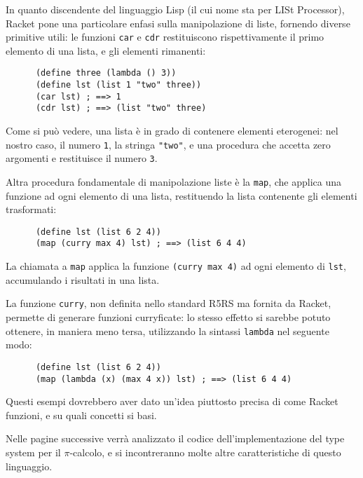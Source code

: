In quanto discendente del linguaggio Lisp (il cui nome sta per LISt
Processor), Racket pone una particolare enfasi sulla manipolazione di
liste, fornendo diverse primitive utili: le funzioni \lstinline{car} e
\lstinline{cdr} restituiscono rispettivamente il primo elemento di una
lista, e gli elementi rimanenti:

\begin{lstlisting}
      (define three (lambda () 3))
      (define lst (list 1 "two" three))
      (car lst) ; ==> 1
      (cdr lst) ; ==> (list "two" three)
\end{lstlisting}

Come si pu\`o vedere, una lista \`e in grado di contenere elementi
eterogenei: nel nostro caso, il numero \lstinline{1}, la stringa
\lstinline{"two"}, e una procedura che accetta zero argomenti e restituisce
il numero \lstinline{3}.

Altra procedura fondamentale di manipolazione liste \`e la \lstinline{map},
che applica una funzione ad ogni elemento di una lista, restituendo la
lista contenente gli elementi trasformati:

\begin{lstlisting}
      (define lst (list 6 2 4))
      (map (curry max 4) lst) ; ==> (list 6 4 4)
\end{lstlisting}

La chiamata a \lstinline{map} applica la funzione \lstinline{(curry max 4)}
ad ogni elemento di \lstinline{lst}, accumulando i risultati in una lista.

La funzione \lstinline{curry}, non definita nello standard R5RS ma fornita
da Racket, permette di generare funzioni curryficate: lo stesso effetto si
sarebbe potuto ottenere, in maniera meno tersa, utilizzando la sintassi
\lstinline{lambda} nel seguente modo:

\begin{lstlisting}
      (define lst (list 6 2 4))
      (map (lambda (x) (max 4 x)) lst) ; ==> (list 6 4 4)
\end{lstlisting}

Questi esempi dovrebbero aver dato un'idea piuttosto precisa di come Racket
funzioni, e su quali concetti si basi.

Nelle pagine successive verr\`a analizzato il codice dell'implementazione
del type system per il $\pi$-calcolo, e si incontreranno molte altre
caratteristiche di questo linguaggio.
